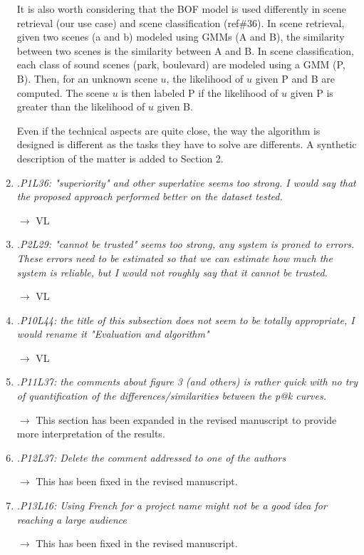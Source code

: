 \documentclass[10pt]{article}
\begin{document}
\begin{enumerate}
It is also worth considering that the BOF model is used differently in scene retrieval (our use case) and scene classification (ref\#36). In scene retrieval, given two scenes (a and b) modeled using GMMs (A and B), the similarity between two scenes is the similarity between A and B. In scene classification, each class of sound scenes (park, boulevard) are modeled using a GMM (P, B). Then, for an unknown scene $u$, the likelihood of $u$ given P and B are computed. The scene $u$ is then labeled P if the likelihood of $u$ given P is greater than the likelihood of $u$ given B.

Even if the technical aspects are quite close, the way the algorithm is designed is different as the tasks they have to solve are differents. A synthetic description of the matter is added to Section 2.

\item \emph{.P1L36: "superiority" and other superlative seems too strong. I would say that the proposed approach performed better on the dataset tested.}

$\rightarrow$ VL

\item \emph{.P2L29: "cannot be trusted" seems too strong, any system is proned to errors. These errors need to be estimated so that we can estimate how much the system is reliable, but I would not roughly say that it cannot be trusted.}

$\rightarrow$ VL

\item \emph{.P10L44: the title of this subsection does not seem to be totally appropriate, I would rename it "Evaluation and algorithm"}

$\rightarrow$ VL

\item \emph{.P11L37: the comments about figure 3 (and others) is rather quick with no try of quantification of the differences/similarities between the p@k curves.}

$\rightarrow$
This section has been expanded in the revised manuscript to provide more interpretation of the results.

\item \emph{.P12L37: Delete the comment addressed to one of the authors}

$\rightarrow$
This has been fixed in the revised manuscript.

\item \emph{.P13L16: Using French for a project name might not be a good idea for reaching a large audience}

$\rightarrow$
This has been fixed in the revised manuscript.

\end{enumerate}
\end{document}
